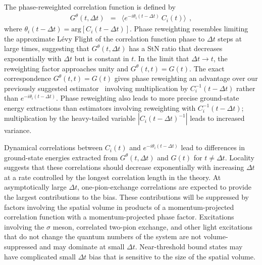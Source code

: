 
The  phase-reweighted correlation function is defined by
%
\begin{eqnarray}
G^{\theta}(t,\Delta t) & = & 
\langle e^{-i \theta_i (t-\Delta t)} \ C_i(t)  \rangle
\  \ ,
\label{eq:PRWdef}
\end{eqnarray}
%
where $\theta_i (t-\Delta t) = \text{arg}[ C_i(t-\Delta t) ]$.
Phase reweighting resembles limiting the approximate L{\'e}vy Flight of the correlation function phase 
to $\Delta t$ steps at large times, suggesting that $G^\theta(t,\Delta t)$ has a StN ratio that decreases exponentially with 
$\Delta t$ but is constant in $t$.
In the limit that $\Delta t \rightarrow t$, the reweighting factor approaches unity and $G^{\theta}(t,t) = G(t)$.
The exact correspondence $G^\theta(t,t)=G(t)$ 
gives phase reweighting
an advantage over our previously suggested estimator~\cite{Wagman:2016bam}  involving 
multiplication by $C_i^{-1}(t-\Delta t)$ rather than $e^{-i\theta_i(t-\Delta t)}$.
Phase reweighting also leads to more precise ground-state energy extractions than estimators involving reweighting with $C_i^{-1}(t-\Delta t)$;
multiplication by the heavy-tailed variable $|C_i(t-\Delta t)^{-1}|$ leads to increased variance.



Dynamical correlations between $C_i(t)$ and $e^{-i\theta_i(t-\Delta t)}$
lead to differences in  ground-state energies extracted from $G^\theta(t,\Delta t)$ and $G(t)$ for $t\neq \Delta t$. 
Locality suggests that these correlations should decrease exponentially with increasing $\Delta t$
at a rate controlled by the longest correlation length in the theory.
At asymptotically large $\Delta t$,
one-pion-exchange correlations are expected to provide the largest contributions to the bias.
These contributions will be
suppressed by factors involving the spatial volume in products of a momentum-projected correlation function with a momentum-projected phase factor.
Excitations involving the $\sigma$ meson, correlated two-pion exchange, and other light
excitations that do not change the quantum numbers of the system
are not volume-suppressed and
may dominate at small $\Delta t$.
Near-threshold bound states may have complicated small $\Delta t$ bias that is sensitive to the size of the spatial volume.



